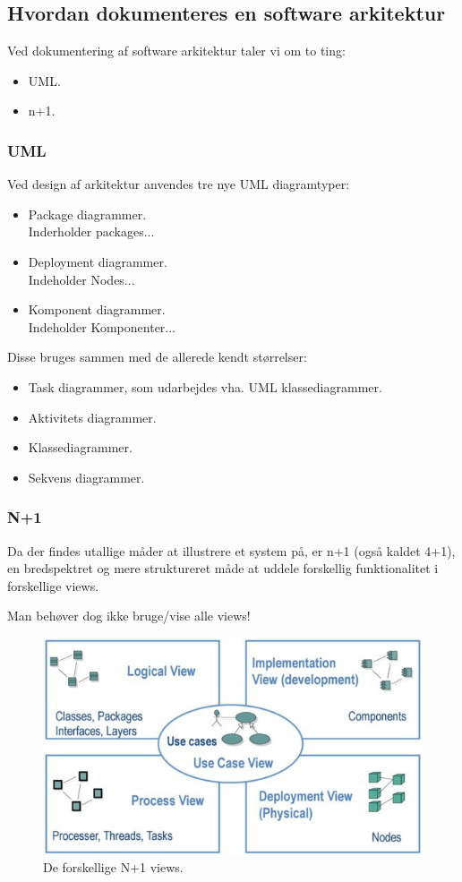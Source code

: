 \subsection{Hvordan dokumenteres en software arkitektur}
Ved dokumentering af software arkitektur taler vi om to ting:
\begin{itemize}
	\item UML.
	\item n+1.
\end{itemize}

\subsubsection{UML}
Ved design af arkitektur anvendes tre nye UML diagramtyper:

\begin{itemize}
	\item Package diagrammer.\\
	Inderholder packages...
	\item Deployment diagrammer.\\
	Indeholder Nodes...
	\item Komponent diagrammer.\\
	Indeholder Komponenter...
\end{itemize}

Disse bruges sammen med de allerede kendt størrelser:

\begin{itemize}
	\item Task diagrammer, som udarbejdes vha. UML klassediagrammer.
	\item Aktivitets diagrammer.
	\item Klassediagrammer.
	\item Sekvens diagrammer.
\end{itemize}

\subsubsection{N+1}
Da der findes utallige måder at illustrere et system på, er n+1 (også kaldet 4+1), en bredspektret og mere struktureret måde at uddele forskellig funktionalitet i forskellige views.

Man behøver dog ikke bruge/vise alle views!

\begin{figure}[H]
	\centering
	\includegraphics[width=0.8\linewidth]{figs/nplusoneview}
	\caption{De forskellige N+1 views.}
	\label{fig:nplusoneview}
\end{figure}

